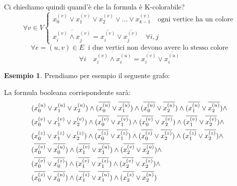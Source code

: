 \documentclass[a4paper]{article}
\theoremstyle{definition}
\newtheorem{esempio}{Esempio}[subsection]
\newcommand{\tikzmark}[1]{\tikz[overlay,remember picture,baseline=(#1.base)]
	\node (#1) {\strut};}
\begin{document}
 			Ci chiediamo quindi quand'è che la formula è K-colorabile?
 			\[
	 			\forall v \in V
	 			\begin{cases}
		 			x_0^{(v)} \vee x_1^{(v)} \vee x_2^{(v)} \vee \dots \vee x_{k-1}^{(v)} \quad \text{ogni vertice ha un colore}\\ \\
		 			\overline{x_i^{(v)} \wedge x_j^{(v)}} = \overline{x_i^{(v)}} \vee \overline{x_j^{(v)}} \quad \forall i,j
	 			\end{cases}
 			\]
	 		\[
		 		\forall e =(u, v) \in E\ \text{ i due vertici non devono avere lo stesso colore}
	 		\]
	 		\[
		 		\forall i \quad \overline{x^{(v)}_i \wedge x_i^{(u)}} =
		 		\overline{x_i^{(v)}} \vee \overline{x_i^{(u)}}
	 		\]
	 		
	 		\begin{esempio}

	 			Prendiamo per esempio il seguente grafo:	 
	 			\begin{center}
				\end{center}
	 			La formula booleana corrispondente sarà:
	 			\begin{align*}
		 			&\tikzmark{a}(x_0^{(u)} \vee x_1^{(u)} \vee x_2^{(u)}) \wedge 
		 			\tikzmark{c}(\overline{x_0^{(u)}} \vee \overline{x_1^{(u)}}) \wedge
		 			(\overline{x_0^{(u)}} \vee \overline{x_2^{(u)}}) \wedge
		 			(\overline{x_1^{(u)}} \vee \overline{x_2^{(u)}})\tikzmark{d} \wedge \\
		 			&(x_0^{(v)} \vee x_1^{(v)} \vee x_2^{(v)}) \wedge 
		 			(\overline{x_0^{(v)}} \vee \overline{x_1^{(v)}}) \wedge
		 			(\overline{x_0^{(v)}} \vee \overline{x_2^{(v)}}) \wedge
		 			(\overline{x_1^{(v)}} \vee \overline{x_2^{(v)}}) \wedge \\
		 			&\tikzmark{b}(x_0^{(z)} \vee x_1^{(z)} \vee x_2^{(z)}) \wedge 
		 			(\overline{x_0^{(z)}} \vee \overline{x_1^{(z)}}) \wedge
		 			(\overline{x_0^{(z)}} \vee \overline{x_2^{(z)}}) \wedge
		 			(\overline{x_1^{(z)}} \vee \overline{x_2^{(z)}}) \wedge \\
		 			&\tikzmark{e}(\overline{x_0^{(v)}} \vee \overline{x_0^{(u)}}) \wedge
		 			(\overline{x_1^{(v)}} \vee \overline{x_1^{(u)}}) \wedge
		 			(\overline{x_2^{(v)}} \vee \overline{x_2^{(u)}}) \wedge \\
		 			&(\overline{x_0^{(v)}} \vee \overline{x_0^{(z)}}) \wedge
		 			(\overline{x_1^{(v)}} \vee \overline{x_1^{(z)}}) \wedge
		 			(\overline{x_2^{(v)}} \vee \overline{x_2^{(z)}}) \wedge \\
		 			&\tikzmark{f}(\overline{x_0^{(z)}} \vee \overline{x_0^{(u)}}) \wedge
		 			(\overline{x_1^{(z)}} \vee \overline{x_1^{(u)}}) \wedge
		 			(\overline{x_2^{(z)}} \vee \overline{x_2^{(u)}})
	 			\end{align*}
				

\end{esempio}
\end{document}
